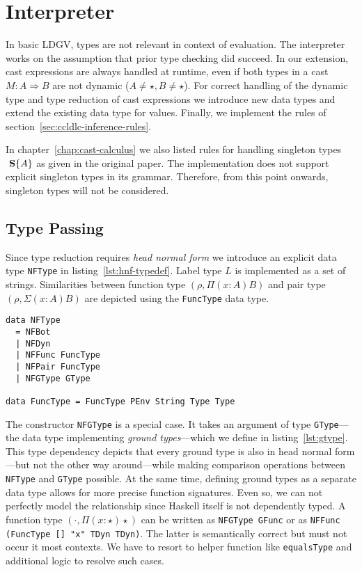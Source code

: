 \section{Interpreter}

In basic LDGV, types are not relevant in context of evaluation. The interpreter works on the assumption that prior type checking did succeed. In our extension, cast expressions are always handled at runtime, even if both types in a cast $M : A \Rightarrow B$ are not dynamic ($A \neq \star, B \neq \star$).
For correct handling of the dynamic type and type reduction of cast expressions we introduce new data types and extend the existing data type for values. Finally, we implement the rules of section~\ref{sec:ccldlc-inference-rules}.

In chapter~\ref{chap:cast-calculus} we also listed rules for handling singleton types $\text{ \textbf{S}}\{A\}$ as given in the original paper. The implementation does not support explicit singleton types in its grammar. Therefore, from this point onwards, singleton types will not be considered.

\subsection{Type Passing}

Since type reduction requires \emph{head normal form} we introduce an explicit data type \texttt{NFType} in listing~\ref{lst:hnf-typedef}. Label type $L$ is implemented as a set of strings. Similarities between function type $(\rho, \Pi(x:A)B)$ and pair type $(\rho, \Sigma(x:A)B)$ are  depicted using the \texttt{FuncType} data type.

\begin{lstlisting}[float,
  label=lst:hnf-typedef,
  caption=HNF type definition (\texttt{ProcessEnvironment.hs})]
data NFType
  = NFBot
  | NFDyn
  | NFFunc FuncType
  | NFPair FuncType
  | NFGType GType

data FuncType = FuncType PEnv String Type Type
\end{lstlisting}

The constructor \texttt{NFGType} is a special case. It takes an argument of type \texttt{GType}---the data type implementing \emph{ground types}---which we define in listing~\ref{lst:gtype}. This type dependency depicts that every ground type is also in head normal form---but not the other way around---while making comparison operations between \texttt{NFType} and \texttt{GType} possible. At the same time, defining ground types as a separate data type allows for more precise function signatures. Even so, we can not perfectly model the relationship since Haskell itself is not dependently typed. A function type $(\cdot, \Pi(x:\star)\star)$ can be written as \texttt{NFGType GFunc} or as \texttt{NFFunc (FuncType [] "x" TDyn TDyn)}. The latter is semantically correct but must not occur it most contexts. We have to resort to helper function like \texttt{equalsType} and additional logic to resolve such cases.

